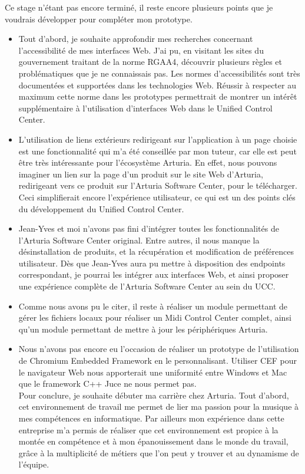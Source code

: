 \documentclass[francais]{rapportPFE}  %
\begin{document}
Ce stage n'étant pas encore terminé, il reste encore plusieurs points que je voudrais développer pour compléter mon prototype.
\begin{itemize}
    \item Tout d'abord, je souhaite approfondir mes recherches concernant l'accessibilité de mes interfaces Web. J'ai pu, en visitant les sites du gouvernement traitant de la norme RGAA4, découvrir plusieurs règles et problématiques que je ne connaissais pas. Les normes d'accessibilités sont très documentées et supportées dans les technologies Web. Réussir à respecter au maximum cette norme dans les prototypes permettrait de montrer un intérêt supplémentaire à l'utilisation d'interfaces Web dans le Unified Control Center.
    \item L'utilisation de liens extérieurs redirigeant sur l'application à un page choisie est une fonctionnalité qui m'a été conseillée par mon tuteur, car elle est peut être très intéressante pour l'écosystème Arturia. En effet, nous pouvons imaginer un lien sur la page d'un produit sur le site Web d'Arturia, redirigeant vers ce produit sur l'Arturia Software Center, pour le télécharger. Ceci simplifierait encore l'expérience utilisateur, ce qui est un des points clés du développement du Unified Control Center.
    \item Jean-Yves et moi n'avons pas fini d'intégrer toutes les fonctionnalités de l'Arturia Software Center original. Entre autres, il nous manque la désinstallation de produits, et la récupération et modification de préférences utilisateur. Dès que Jean-Yves aura pu mettre à disposition des endpoints correspondant, je pourrai les intégrer aux interfaces Web, et ainsi proposer une expérience complète de l'Arturia Software Center au sein du UCC.
    \item Comme nous avons pu le citer, il reste à réaliser un module permettant de gérer les fichiers locaux pour réaliser un Midi Control Center complet, ainsi qu'un module permettant de mettre à jour les périphériques Arturia.
    \item Nous n'avons pas encore eu l'occasion de réaliser un prototype de l'utilisation de Chromium Embedded Framework en le personnalisant. Utiliser CEF pour le navigateur Web nous apporterait une uniformité entre Windows et Mac que le framework C++ Juce ne nous permet pas.\\

Pour conclure, je souhaite débuter ma carrière chez Arturia. Tout d'abord, cet environnement de travail me permet de lier ma passion pour la musique à mes compétences en informatique. Par ailleurs mon expérience dans cette entreprise m'a permis de réaliser que cet environnement est propice à la montée en compétence et à mon épanouissement dans le monde du travail, grâce à la multiplicité de métiers que l'on peut y trouver et au dynamisme de l'équipe.
\end{itemize}
\end{document}
